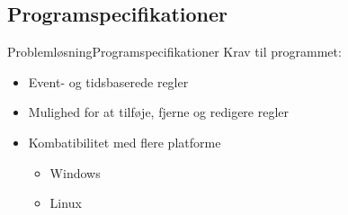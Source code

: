\subsection{Programspecifikationer}
\begin{frame}{Problemløsning}{Programspecifikationer}
Krav til programmet:
\begin{itemize}
	\item Event- og tidsbaserede regler
	\item Mulighed for at tilføje, fjerne og redigere regler
	\item Kombatibilitet med flere platforme
	\begin{itemize}
		\item Windows
		\item Linux
	\end{itemize}
\end{itemize}
\end{frame}